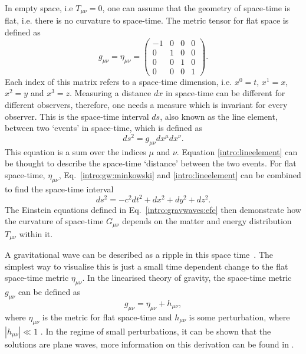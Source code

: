 In empty space, i.e $T_{\mu \nu} = 0$, one can assume that the geometry of space-time is flat, i.e. there is no curvature to space-time. The metric tensor for flat space is defined as
\begin{equation}
    \label{intro:gw:minkowski}
g_{\mu \nu} = \eta_{\mu \nu} = \left(
\begin{matrix}
-1 & 0 & 0 & 0 \\
0 & 1 & 0 & 0 \\
0 & 0 & 1 & 0 \\
0 & 0 & 0 & 1 
\end{matrix}
\right).
\end{equation}
Each index of this matrix refers to a space-time dimension, i.e. $x^0 = t$,
$x^1=x$, $x^2=y$ and $x^3=z$.  Measuring a distance $dx$ in space-time can be
different for different observers, therefore, one needs a measure which is
invariant for every observer.  This is the space-time interval $ds$, also known
as the line element, between two `events' in space-time, which is defined as
\begin{equation}
\label{intro:lineelement}
    ds^2 = g_{\mu \nu} dx^{\mu}dx^{\nu}.
\end{equation}
This equation is a sum over the indices $\mu$ and
$\nu$.  
Equation \ref{intro:lineelement} can be
thought to describe the space-time `distance' between the two events.  For flat
space-time, $\eta_{\mu\nu}$, Eq.~\ref{intro:gw:minkowski} and \ref{intro:lineelement} can be combined to find the space-time interval
%
\begin{equation}
    ds^2 = -c^2 dt^2 + dx^2 + dy^2 + dz^2.
\end{equation}
%
The Einstein equations defined in Eq.~\ref{intro:gravwaves:efe}
then demonstrate how the curvature of space-time $G_{\mu\nu}$ depends on the
matter and energy distribution $T_{\mu \nu}$ within it.~

A gravitational wave can be described as a ripple in this space time~.  The simplest way to
visualise this is just a small time dependent change to the flat space-time
metric $\eta_{\mu\nu}$.  In the linearised theory of gravity, the
space-time metric $g_{\mu \nu}$ can be defined as
\begin{equation}
\label{intro:gravwave:metric}
    g_{\mu \nu} = \eta_{\mu \nu} + h_{\mu \nu},
\end{equation}
where $ \eta_{\mu \nu}$ is the metric for flat space-time and $h_{\mu \nu}$ is
some perturbation, where $|h_{\mu \nu}| \ll 1$
\citep{flanagan2005BasicsGravitational}. In the regime of small perturbations, it can be shown that the solutions are plane waves,
more information on this derivation can be found in
\citep{flanagan2005BasicsGravitational,letiec2016TheoryGravitational}.  

